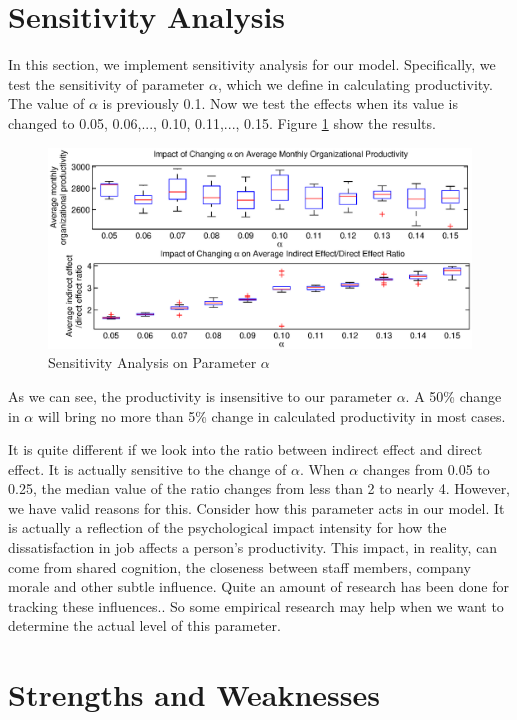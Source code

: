 \documentclass[tcn = 37075, sheet = false, abstract = false]{mcmthesis}
\begin{document}
\section{Sensitivity Analysis}

In this section, we implement sensitivity analysis for our model. Specifically, we test the sensitivity of parameter $\alpha$, which we define in calculating productivity. The value of $\alpha$ is previously 0.1. Now we test the effects when its value is changed to 0.05, 0.06,..., 0.10, 0.11,..., 0.15. Figure \ref{fig:sa} show the results. 

\begin{figure}[htb!]
\centering
\includegraphics[width=16cm]{figures/Sensitivity.eps}
\caption{Sensitivity Analysis on Parameter $\alpha$} 
\label{fig:sa}
\end{figure}

As we can see, the productivity is insensitive to our parameter $\alpha$. A 50\% change in $\alpha$ will bring no more than 5\% change in calculated productivity in most cases. 

It is quite different if we look into the ratio between indirect effect and direct effect. It is actually sensitive to the change of $\alpha$. When $\alpha$ changes from 0.05 to 0.25, the median value of the ratio changes from less than 2 to nearly 4. However, we have valid reasons for this. Consider how this parameter acts in our model. It is actually a reflection of the psychological impact intensity for how the dissatisfaction in job affects a person's productivity. This impact, in reality, can come from shared cognition, the closeness between staff members, company morale and other subtle influence. Quite an amount of research has been done for tracking these influences.\cite{seligman2000positive}. So some empirical research may help when we want to determine the actual level of this parameter.

\section{Strengths and Weaknesses}
\end{document}
